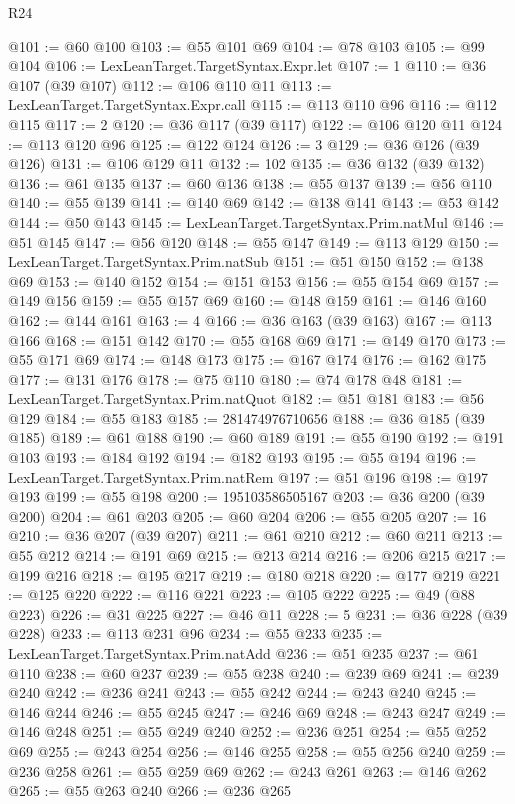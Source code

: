 \begin{lexlean}{R24}
\begin{coremodule}
@101 := @60 @100
@103 := @55 @101 @69
@104 := @78 @103
@105 := @99 @104
@106 := LexLeanTarget.TargetSyntax.Expr.let
@107 := 1
@110 := @36 @107 (@39 @107)
@112 := @106 @110 @11
@113 := LexLeanTarget.TargetSyntax.Expr.call
@115 := @113 @110 @96
@116 := @112 @115
@117 := 2
@120 := @36 @117 (@39 @117)
@122 := @106 @120 @11
@124 := @113 @120 @96
@125 := @122 @124
@126 := 3
@129 := @36 @126 (@39 @126)
@131 := @106 @129 @11
@132 := 102
@135 := @36 @132 (@39 @132)
@136 := @61 @135
@137 := @60 @136
@138 := @55 @137
@139 := @56 @110
@140 := @55 @139
@141 := @140 @69
@142 := @138 @141
@143 := @53 @142
@144 := @50 @143
@145 := LexLeanTarget.TargetSyntax.Prim.natMul
@146 := @51 @145
@147 := @56 @120
@148 := @55 @147
@149 := @113 @129
@150 := LexLeanTarget.TargetSyntax.Prim.natSub
@151 := @51 @150
@152 := @138 @69
@153 := @140 @152
@154 := @151 @153
@156 := @55 @154 @69
@157 := @149 @156
@159 := @55 @157 @69
@160 := @148 @159
@161 := @146 @160
@162 := @144 @161
@163 := 4
@166 := @36 @163 (@39 @163)
@167 := @113 @166
@168 := @151 @142
@170 := @55 @168 @69
@171 := @149 @170
@173 := @55 @171 @69
@174 := @148 @173
@175 := @167 @174
@176 := @162 @175
@177 := @131 @176
@178 := @75 @110
@180 := @74 @178 @48
@181 := LexLeanTarget.TargetSyntax.Prim.natQuot
@182 := @51 @181
@183 := @56 @129
@184 := @55 @183
@185 := 281474976710656
@188 := @36 @185 (@39 @185)
@189 := @61 @188
@190 := @60 @189
@191 := @55 @190
@192 := @191 @103
@193 := @184 @192
@194 := @182 @193
@195 := @55 @194
@196 := LexLeanTarget.TargetSyntax.Prim.natRem
@197 := @51 @196
@198 := @197 @193
@199 := @55 @198
@200 := 195103586505167
@203 := @36 @200 (@39 @200)
@204 := @61 @203
@205 := @60 @204
@206 := @55 @205
@207 := 16
@210 := @36 @207 (@39 @207)
@211 := @61 @210
@212 := @60 @211
@213 := @55 @212
@214 := @191 @69
@215 := @213 @214
@216 := @206 @215
@217 := @199 @216
@218 := @195 @217
@219 := @180 @218
@220 := @177 @219
@221 := @125 @220
@222 := @116 @221
@223 := @105 @222
@225 := @49 (@88 @223)
@226 := @31 @225
@227 := @46 @11
@228 := 5
@231 := @36 @228 (@39 @228)
@233 := @113 @231 @96
@234 := @55 @233
@235 := LexLeanTarget.TargetSyntax.Prim.natAdd
@236 := @51 @235
@237 := @61 @110
@238 := @60 @237
@239 := @55 @238
@240 := @239 @69
@241 := @239 @240
@242 := @236 @241
@243 := @55 @242
@244 := @243 @240
@245 := @146 @244
@246 := @55 @245
@247 := @246 @69
@248 := @243 @247
@249 := @146 @248
@251 := @55 @249 @240
@252 := @236 @251
@254 := @55 @252 @69
@255 := @243 @254
@256 := @146 @255
@258 := @55 @256 @240
@259 := @236 @258
@261 := @55 @259 @69
@262 := @243 @261
@263 := @146 @262
@265 := @55 @263 @240
@266 := @236 @265

\end{coremodule}
\end{lexlean}
